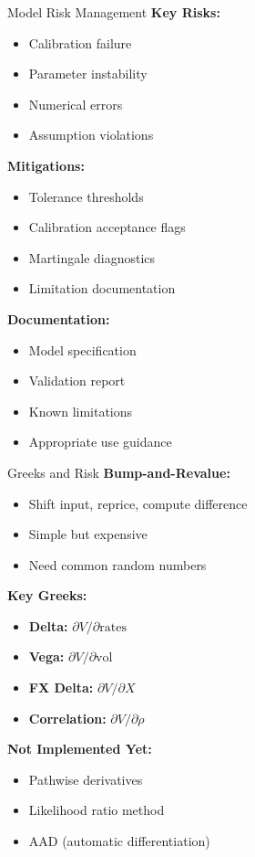 \documentclass[aspectratio=169,11pt]{beamer}
\begin{document}
\begin{frame}{Model Risk Management}
\textbf{Key Risks:}
\begin{itemize}
    \item Calibration failure
    \item Parameter instability
    \item Numerical errors
    \item Assumption violations
\end{itemize}

\textbf{Mitigations:}
\begin{itemize}
    \item Tolerance thresholds
    \item Calibration acceptance flags
    \item Martingale diagnostics
    \item Limitation documentation
\end{itemize}

\textbf{Documentation:}
\begin{itemize}
    \item Model specification
    \item Validation report
    \item Known limitations
    \item Appropriate use guidance
\end{itemize}
\end{frame}

\begin{frame}{Greeks and Risk}
\textbf{Bump-and-Revalue:}
\begin{itemize}
    \item Shift input, reprice, compute difference
    \item Simple but expensive
    \item Need common random numbers
\end{itemize}

\textbf{Key Greeks:}
\begin{itemize}
    \item \textbf{Delta:} $\partial V / \partial \text{rates}$
    \item \textbf{Vega:} $\partial V / \partial \text{vol}$
    \item \textbf{FX Delta:} $\partial V / \partial X$
    \item \textbf{Correlation:} $\partial V / \partial \rho$
\end{itemize}

\textbf{Not Implemented Yet:}
\begin{itemize}
    \item Pathwise derivatives
    \item Likelihood ratio method
    \item AAD (automatic differentiation)
\end{itemize}
\end{frame}
\end{document}
